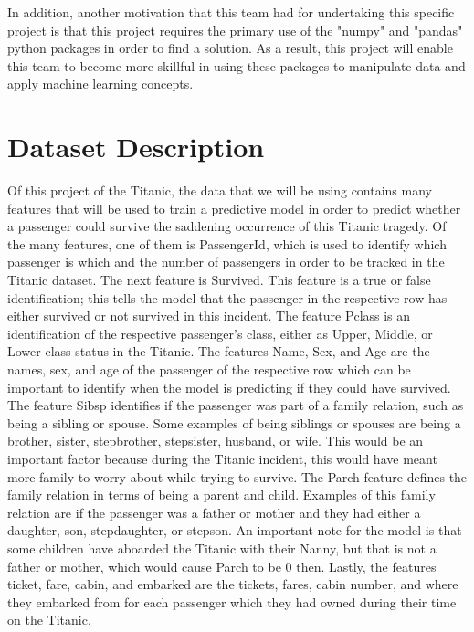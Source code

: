 \documentclass{APA}
\begin{document}
In addition, another motivation that this team had for undertaking this specific project is that this project requires the primary use of the "numpy" and "pandas" python packages in order to find a solution. As a result, this project will enable this team to become more skillful in using these packages to manipulate data and apply machine learning concepts.
\newpage



\section{Dataset Description}
	Of this project of the Titanic, the data that we will be using contains many features that will be used to train a predictive model in order to predict whether a passenger could survive the saddening occurrence of this Titanic tragedy. Of the many features, one of them is PassengerId, which is used to identify which passenger is which and the number of passengers in order to be tracked in the Titanic dataset. The next feature is Survived. This feature is a true or false identification; this tells the model that the passenger in the respective row has either survived or not survived in this incident. The feature Pclass is an identification of the respective passenger's class, either as Upper, Middle, or Lower class status in the Titanic. The features Name, Sex, and Age are the names, sex, and age of the passenger of the respective row which can be important to identify when the model is predicting if they could have survived. The feature Sibsp identifies if the passenger was part of a family relation, such as being a sibling or spouse. Some examples of being siblings or spouses are being a brother, sister, stepbrother, stepsister, husband, or wife. This would be an important factor because during the Titanic incident, this would have meant more family to worry about while trying to survive. The Parch feature defines the family relation in terms of being a parent and child. Examples of this family relation are if the passenger was a father or mother and they had either a daughter, son, stepdaughter, or stepson. An important note for the model is that some children have aboarded the Titanic with their Nanny, but that is not a father or mother, which would cause Parch to be 0 then. Lastly, the features ticket, fare, cabin, and embarked are the tickets, fares, cabin number, and where they embarked from for each passenger which they had owned during their time on the Titanic.

\newpage
\end{document}
